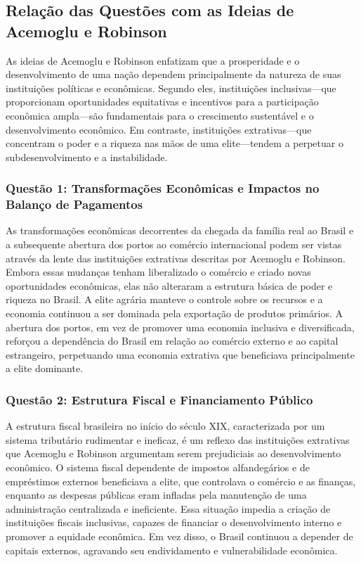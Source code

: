 \documentclass[a4paper,12pt]{article}[abntex2]
\begin{document}
\newpage

\subsection{\textbf{Relação das Questões com as Ideias de Acemoglu e Robinson}}

As ideias de Acemoglu e Robinson enfatizam que a prosperidade e o desenvolvimento de uma nação dependem principalmente da natureza de suas instituições políticas e econômicas. Segundo eles, instituições inclusivas—que proporcionam oportunidades equitativas e incentivos para a participação econômica ampla—são fundamentais para o crescimento sustentável e o desenvolvimento econômico. Em contraste, instituições extrativas—que concentram o poder e a riqueza nas mãos de uma elite—tendem a perpetuar o subdesenvolvimento e a instabilidade.

\subsubsection{\textbf{Questão 1: Transformações Econômicas e Impactos no Balanço de Pagamentos}}

As transformações econômicas decorrentes da chegada da família real ao Brasil e a subsequente abertura dos portos ao comércio internacional podem ser vistas através da lente das instituições extrativas descritas por Acemoglu e Robinson. Embora essas mudanças tenham liberalizado o comércio e criado novas oportunidades econômicas, elas não alteraram a estrutura básica de poder e riqueza no Brasil. A elite agrária manteve o controle sobre os recursos e a economia continuou a ser dominada pela exportação de produtos primários. A abertura dos portos, em vez de promover uma economia inclusiva e diversificada, reforçou a dependência do Brasil em relação ao comércio externo e ao capital estrangeiro, perpetuando uma economia extrativa que beneficiava principalmente a elite dominante.

\subsubsection{\textbf{Questão 2: Estrutura Fiscal e Financiamento Público}}

A estrutura fiscal brasileira no início do século XIX, caracterizada por um sistema tributário rudimentar e ineficaz, é um reflexo das instituições extrativas que Acemoglu e Robinson argumentam serem prejudiciais ao desenvolvimento econômico. O sistema fiscal dependente de impostos alfandegários e de empréstimos externos beneficiava a elite, que controlava o comércio e as finanças, enquanto as despesas públicas eram infladas pela manutenção de uma administração centralizada e ineficiente. Essa situação impedia a criação de instituições fiscais inclusivas, capazes de financiar o desenvolvimento interno e promover a equidade econômica. Em vez disso, o Brasil continuou a depender de capitais externos, agravando seu endividamento e vulnerabilidade econômica.
\end{document}
